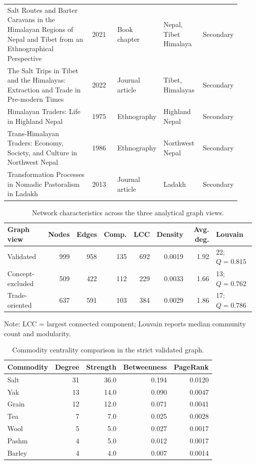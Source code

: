 \begin{table}[htbp]
\begin{tabular}{p{0.38\linewidth}p{0.11\linewidth}p{0.18\linewidth}p{0.17\linewidth}p{0.10\linewidth}}
Salt Routes and Barter Caravans in the Himalayan Regions of Nepal and Tibet from an Ethnographical Perspective & 2021 & Book chapter & Nepal, Tibet Himalaya & Secondary \\
The Salt Trips in Tibet and the Himalayas: Extraction and Trade in Pre-modern Times & 2022 & Journal article & Tibet, Himalayas & Secondary \\
Himalayan Traders: Life in Highland Nepal & 1975 & Ethnography & Highland Nepal & Secondary \\
Trans-Himalayan Traders: Economy, Society, and Culture in Northwest Nepal & 1986 & Ethnography & Northwest Nepal & Secondary \\
Transformation Processes in Nomadic Pastoralism in Ladakh & 2013 & Journal article & Ladakh & Secondary \\
\hline
\end{tabular}
\end{table}

\begin{table}[htbp]
\centering
\caption{Network characteristics across the three analytical graph views.}
\label{tab:network-characteristics}
\small
\begin{tabular}{lrrrrrrl}
\hline
Graph view & Nodes & Edges & Comp. & LCC & Density & Avg. deg. & Louvain \\
\hline
Validated & 999 & 958 & 135 & 692 & 0.0019 & 1.92 & 22; $Q=0.815$ \\
Concept-excluded & 509 & 422 & 112 & 229 & 0.0033 & 1.66 & 13; $Q=0.762$ \\
Trade-oriented & 637 & 591 & 103 & 384 & 0.0029 & 1.86 & 17; $Q=0.786$ \\
\hline
\end{tabular}
\begin{flushleft}
\footnotesize Note: LCC = largest connected component; Louvain reports median community count and modularity.
\end{flushleft}
\end{table}

\begin{table}[htbp]
\centering
\caption{Commodity centrality comparison in the strict validated graph.}
\label{tab:commodity-centrality}
\small
\begin{tabular}{lrrrr}
\hline
Commodity & Degree & Strength & Betweenness & PageRank \\
\hline
Salt & 31 & 36.0 & 0.194 & 0.0120 \\
Yak & 13 & 14.0 & 0.090 & 0.0047 \\
Grain & 12 & 12.0 & 0.071 & 0.0041 \\
Tea & 7 & 7.0 & 0.025 & 0.0028 \\
Wool & 5 & 5.0 & 0.027 & 0.0017 \\
Pashm & 4 & 5.0 & 0.012 & 0.0017 \\
Barley & 4 & 4.0 & 0.007 & 0.0014 \\
\hline
\end{tabular}
\end{table}
